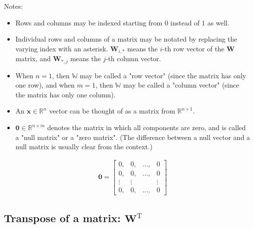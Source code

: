 \documentclass[titlepage]{article}
\begin{document}
        Notes:

        \begin{itemize}
          \item Rows and columns may be indexed starting from $0$ instead of $1$
                as well.

          \item Individual rows and columns of a matrix may be notated by
                replacing the varying index with an asterisk. $\mathbf{W}_{i,*}$
                means the $i$-th row vector of the $\mathbf{W}$ matrix, and
                $\mathbf{W}_{*,j}$ means the $j$-th column vector.

          \item When $n = 1$, then $\mathbb{W}$ may be called a "row vector"
                (since the matrix has only one row), and when $m = 1$, then
                $\mathbb{W}$ may be called a "column vector" (since the matrix
                has only one column).

          \item An $\mathbf{x} \in \mathbb{R}^n$ vector can be thought of as a
                matrix from $\mathbb{R}^{n \times 1}$.

          \item $\mathbf{0} \in \mathbb{R}^{n \times m}$ denotes the matrix in
                which all components are zero, and is called a "null matrix" or
                a "zero matrix". (The difference between a null vector and a
                null matrix is usually clear from the context.)

                \begin{align*}
                  \mathbf{0}
                    = \begin{bmatrix}
                        0, & 0, & \ldots, & 0 \\
                        0, & 0, & \ldots, & 0 \\
                        \vdots & \vdots & & \vdots \\
                        0, & 0, & \ldots, & 0
                      \end{bmatrix}
                \end{align*}
        \end{itemize}

      \subsection{Transpose of a matrix: $\mathbf{W}^\mathrm{T}$}
\end{document}
